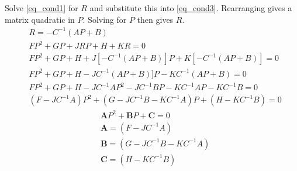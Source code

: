 \documentclass[letterpaper,12pt]{article}
\begin{document}
\begin{spacing}{1.5}
Solve \eqref{eq_cond1} for $R$ and substitute this into \eqref{eq_cond3}.  Rearranging gives a matrix quadratic in $P$.  Solving for $P$ then gives $R$.
\begin{align}
	& R = -C^{-1} (AP + B) \nonumber \\
	& FP^2 + GP + JRP + H + KR = 0 \nonumber \\
	& FP^2 + GP + H + J[-C^{-1} (AP + B)] P + K [-C^{-1} (AP + B)] = 0 \nonumber \\
	& FP^2 + GP + H - JC^{-1} (AP + B)] P - K C^{-1} (AP + B) = 0 \nonumber \\
	& FP^2 + GP + H - JC^{-1} AP^2  - J C^{-1} BP - K C^{-1} AP - K C^{-1} B = 0 \nonumber \\ 
	& (F - JC^{-1}A) P^2 + (G - JC^{-1}B - KC^{-1}A) P + (H - K C^{-1} B) = 0
\end{align}
\begin{align}
	& \mathbf{A} P^2 + \mathbf{B} P + \mathbf{C} = 0 \nonumber \\
	& \mathbf{A} = (F - JC^{-1}A) \nonumber \\
	& \mathbf{B} = (G - JC^{-1}B - KC^{-1}A) \nonumber \\
	& \mathbf{C} = (H - K C^{-1} B) \nonumber
\end{align}


\end{spacing}
\end{document}
